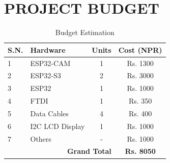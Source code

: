 \chapter{PROJECT BUDGET}
\begin{table}[H]
    \centering
    \small
    \caption{Budget Estimation}
    \begin{tabular}{p{1cm}p{6cm}cc}
        \toprule
        \textbf{S.N.} & \textbf{Hardware} & \textbf{Units} & \textbf{Cost (NPR)} \\
        \midrule
        1 & ESP32-CAM       & 1 & Rs. 1300 \\
        2 & ESP32-S3        & 2 & Rs. 3000 \\
        3 & ESP32           & 1 & Rs. 1000 \\
        4 & FTDI            & 1 & Rs. 350  \\
        5 & Data Cables     & 4 & Rs. 400  \\
        6 & I2C LCD Display & 1 & Rs. 1000 \\
        7 & Others          & - & Rs. 1000 \\
        \midrule
        \multicolumn{3}{r}{\textbf{Grand Total}} & \textbf{Rs. 8050} \\
        \bottomrule
    \end{tabular}
    \label{tab:budget}
\end{table}

